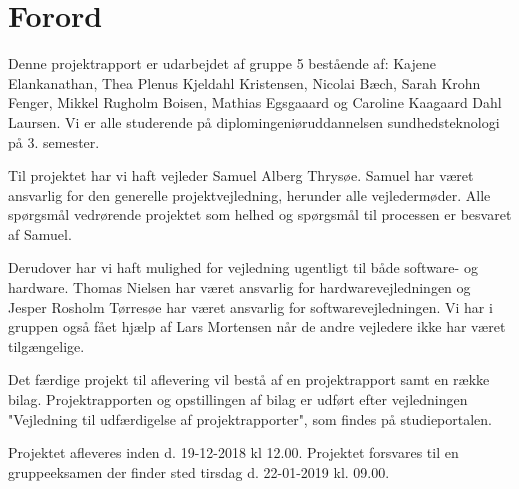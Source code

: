 \chapter{Forord}

Denne projektrapport er udarbejdet af gruppe 5 bestående af: Kajene Elankanathan, Thea Plenus Kjeldahl Kristensen, Nicolai Bæch, Sarah Krohn Fenger, Mikkel Rugholm Boisen, Mathias Egsgaaard og Caroline Kaagaard Dahl Laursen. Vi er alle studerende på diplomingeniøruddannelsen sundhedsteknologi på 3. semester. 

Til projektet har vi haft vejleder Samuel Alberg Thrysøe. Samuel har været ansvarlig for den generelle projektvejledning, herunder alle vejledermøder. Alle spørgsmål vedrørende projektet som helhed og spørgsmål til processen er besvaret af Samuel.

Derudover har vi haft mulighed for vejledning ugentligt til både software- og hardware. Thomas Nielsen har været ansvarlig for hardwarevejledningen og Jesper Rosholm Tørresøe har været ansvarlig for softwarevejledningen. Vi har i gruppen også fået hjælp af Lars Mortensen når de andre vejledere ikke har været tilgængelige. 

Det færdige projekt til aflevering vil bestå af en projektrapport samt en række bilag. Projektrapporten og opstillingen af bilag er udført efter vejledningen "Vejledning til udfærdigelse af projektrapporter", som findes på studieportalen. 

Projektet afleveres inden d. 19-12-2018 kl 12.00. Projektet forsvares til en gruppeeksamen der finder sted tirsdag d. 22-01-2019 kl. 09.00.
\clearpage